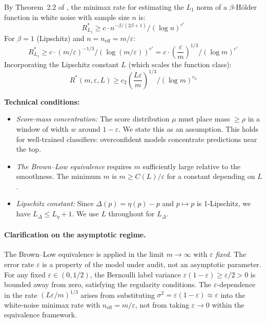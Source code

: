 \documentclass{article}
\newcommand{\Lip}{L}
\newcommand{\errrate}{\varepsilon}
\newcommand{\nsamples}{m}
\newcommand{\calmapraw}{\eta}
\newcommand{\calmap}{\Delta}
\newcommand{\scoredist}{\mu}
\newcommand{\effnoise}{\sigma^2}
\theoremstyle{definition}
\begin{document}
By Theorem~2.2 of \citet{lepski1999estimation}, the minimax rate for estimating the $L_1$ norm of a $\beta$-H\"older function in white noise with sample size $n$ is:
\begin{equation}
R^*_{L_1} \geq c \cdot n^{-\beta/(2\beta+1)} / (\log n)^{c'}
\end{equation}
For $\beta = 1$ (Lipschitz) and $n = n_{\mathrm{eff}} = \nsamples / \errrate$:
\begin{equation}
R^*_{L_1} \geq c \cdot (\nsamples / \errrate)^{-1/3} / (\log(\nsamples/\errrate))^{c'} = c \cdot \left(\frac{\errrate}{\nsamples}\right)^{1/3} / (\log \nsamples)^{c'}
\end{equation}
Incorporating the Lipschitz constant $\Lip$ (which scales the function class):
\begin{equation}
R^*(\nsamples, \errrate, \Lip) \geq c_2 \left(\frac{\Lip \errrate}{\nsamples}\right)^{1/3} / (\log \nsamples)^{c_3}
\end{equation}

\textbf{Technical conditions:}
\begin{itemize}
    \item \emph{Score-mass concentration:} The score distribution $\scoredist$ must place mass $\geq \rho$ in a window of width $w$ around $1 - \errrate$. We state this as an assumption. This holds for well-trained classifiers: overconfident models concentrate predictions near the top.
    \item \emph{The Brown--Low equivalence} requires $\nsamples$ sufficiently large relative to the smoothness. The minimum $\nsamples$ is $\nsamples \geq C(\Lip) / \errrate$ for a constant depending on $\Lip$.
    \item \emph{Lipschitz constant:} Since $\calmap(p) = \calmapraw(p) - p$ and $p \mapsto p$ is 1-Lipschitz, we have $\Lip_\calmap \leq \Lip_\calmapraw + 1$. We use $\Lip$ throughout for $\Lip_\calmap$.
\end{itemize}

\paragraph{Clarification on the asymptotic regime.} The Brown--Low equivalence is applied in the limit $\nsamples \to \infty$ with $\errrate$ \emph{fixed}. The error rate $\errrate$ is a property of the model under audit, not an asymptotic parameter. For any fixed $\errrate \in (0, 1/2)$, the Bernoulli label variance $\errrate(1-\errrate) \geq \errrate/2 > 0$ is bounded away from zero, satisfying the regularity conditions. The $\errrate$-dependence in the rate $(\Lip\errrate/\nsamples)^{1/3}$ arises from substituting $\effnoise = \errrate(1-\errrate) \approx \errrate$ into the white-noise minimax rate with $n_{\mathrm{eff}} = \nsamples / \errrate$, not from taking $\errrate \to 0$ within the equivalence framework.
\end{document}
